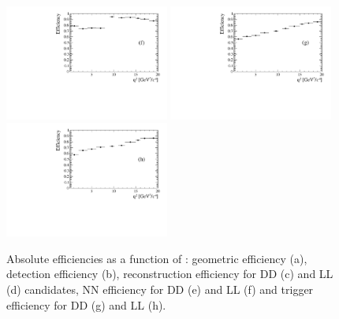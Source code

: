 \begin{figure}
\includegraphics[width=0.48\textwidth]{Lmumu/figs/efficiencies/BR/effvsq2_LL_mva.pdf}
\includegraphics[width=0.48\textwidth]{Lmumu/figs/efficiencies/BR/effvsq2_DD_trig.pdf}
\includegraphics[width=0.48\textwidth]{Lmumu/figs/efficiencies/BR/effvsq2_LL_trig.pdf}
\caption{Absolute efficiencies as a function of \qsq: geometric efficiency (a), 
detection efficiency (b), reconstruction efficiency for DD (c) and LL (d) candidates, 
NN efficiency for DD (e) and LL (f) and trigger efficiency for DD (g) and LL (h).}
\label{fig:Lb_absEff}
\end{figure}

\clearpage
